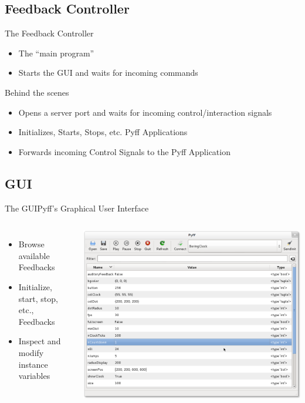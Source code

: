 \documentclass{beamer}
\begin{document}
\subsection{Feedback Controller}
\begin{frame}{The Feedback Controller}
    \begin{itemize}
        \item The ``main program''
        \item Starts the GUI and waits for incoming commands
    \end{itemize}
    \begin{block}{Behind the scenes}
        \begin{itemize}
            \item Opens a server port and waits for incoming
                control/interaction signals
            \item Initializes, Starts, Stops, etc. Pyff Applications
            \item Forwards incoming Control Signals to the Pyff Application
        \end{itemize}
    \end{block}
\end{frame}

\subsection{GUI}
\begin{frame}{The GUI}{Pyff's Graphical User Interface}
    \begin{columns}[T]
            \begin{itemize}
                \item Browse available Feedbacks
                \item Initialize, start, stop, etc., Feedbacks
                \item Inspect and \alert{modify} instance variables
            \end{itemize}
             \includegraphics[width=\textwidth]{gui}
   \end{columns}
\end{frame}
\end{document}
